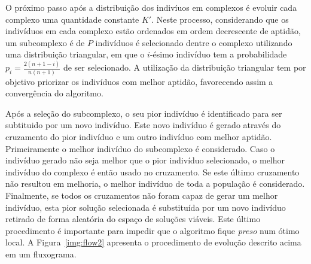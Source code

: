 O próximo passo após a distribuição dos indivíuos em complexos é evoluir cada
complexo uma quantidade constante $K'$.
Neste processo, considerando que os indivíduos em cada complexo estão ordenados
em ordem decrescente de aptidão, um subcomplexo é de $P$ indivíduos é selecionado
dentre o complexo utilizando uma distribuição triangular, em que o $i$-ésimo
indivíduo tem a probabilidade $p_i = \frac{2(n+1-i)}{n(n+1)}$ de ser selecionado.
A utilização da distribuição triangular tem por objetivo priorizar os indivíduos
com melhor aptidão, favorecendo assim a convergência do algoritmo.

Após a seleção do subcomplexo, o seu pior indivíduo é identificado para ser
subtituido por um novo indivíduo.
Este novo indivíduo é gerado através do cruzamento do pior indivíduo e um outro
indivíduo com melhor aptidão.
Primeiramente o melhor indivíduo do subcomplexo é considerado.
Caso o indivíduo gerado não seja melhor que o pior indivíduo selecionado,
o melhor indivíduo do complexo é então usado no cruzamento.
Se este último cruzamento não resultou em melhoria, o melhor indivíduo de toda
a população é considerado.
Finalmente, se todos os cruzamentos não foram capaz de gerar um melhor indivíduo,
esta pior solução selecionada é substituída por um novo indivíduo retirado de
forma aleatória do espaço de soluções viáveis.
Este último procedimento é importante para impedir que o algoritmo fique
\emph{preso} num ótimo local.
A Figura~\ref{img:flow2} apresenta o procedimento de evolução descrito acima
em um fluxograma.

